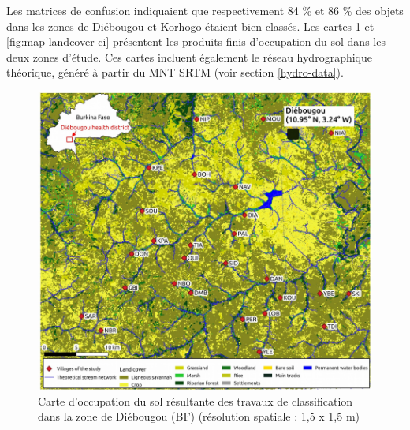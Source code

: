 \documentclass[12pt,twoside]{reedthesis}
\begin{document}
Les matrices de confusion indiquaient que respectivement 84 \% et 86 \% des objets dans les zones de Diébougou et Korhogo étaient bien classés. Les cartes \ref{fig:map-landcover-bf} et \ref{fig:map-landcover-ci} présentent les produits finis d'occupation du sol dans les deux zones d'étude. Ces cartes incluent également le réseau hydrographique théorique, généré à partir du MNT SRTM (voir section \ref{hydro-data}).
\begin{figure}

{\centering \includegraphics[width=1\linewidth]{figure/map_landcover_bf} 

}

\caption[Carte d'occupation du sol résultante des travaux de classification dans la zone de Diébougou (BF)]{Carte d'occupation du sol résultante des travaux de classification dans la zone de Diébougou (BF) (résolution spatiale : 1,5 x 1,5 m)}\label{fig:map-landcover-bf}
\end{figure}
\pagebreak
\end{document}
